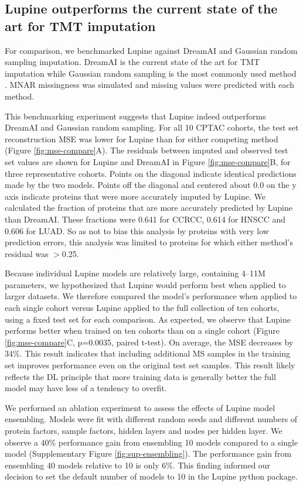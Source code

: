\documentclass{article}
\begin{document}
\subsection{Lupine outperforms the current state of the art for TMT imputation}

For comparison, we benchmarked Lupine against DreamAI and Gaussian random sampling imputation. DreamAI is the current state of the art for TMT imputation \cite{dream-ai} while Gaussian random sampling is the most commonly used method \cite{ms-impute-bench}. MNAR missingness was simulated and missing values were predicted with each method. 

This benchmarking experiment suggests that Lupine indeed outperforms DreamAI and Gaussian random sampling. For all 10 CPTAC cohorts, the test set reconstruction MSE was lower for Lupine than for either competing method (Figure \ref{fig:mse-compare}A). The residuals between imputed and observed test set values are shown for Lupine and DreamAI in Figure \ref{fig:mse-compare}B, for three representative cohorts. Points on the diagonal indicate identical predictions made by the two models. Points off the diagonal and centered about 0.0 on the y axis indicate proteins that were more accurately imputed by Lupine. We calculated the fraction of proteins that are more accurately predicted by Lupine than DreamAI. These fractions were 0.641 for CCRCC, 0.614 for HNSCC and 0.606 for LUAD. So as not to bias this analysis by proteins with very low prediction errors, this analysis was limited to proteins for which either method’s residual was $>$0.25. 

Because individual Lupine models are relatively large, containing 4--11M parameters, we hypothesized that Lupine would perform best when applied to larger datasets. We therefore compared the model's performance when applied to each single cohort versus Lupine applied to the full collection of ten cohorts, using a fixed test set for each comparison.  As expected, we observe that Lupine performs better when trained on ten cohorts than on a single cohort (Figure \ref{fig:mse-compare}C, p=0.0035, paired t-test). On average, the MSE decreases by 34\%.  This result indicates that including additional MS samples in the training set improves performance even on the original test set samples. This result likely reflects the DL principle that more training data is generally better \cite{goodfellow-2016}\textemdash the full model may have less of a tendency to overfit. 

We performed an ablation experiment to assess the effects of Lupine model ensembling. Models were fit with different random seeds and different numbers of protein factors, sample factors, hidden layers and nodes per hidden layer. We observe a 40\% performance gain from ensembling 10 models compared to a single model (Supplementary Figure \ref{fig:sup-ensembling}). The performance gain from ensembling 40 models relative to 10 is only 6\%. This finding informed our decision to set the default number of models to 10 in the Lupine python package. 
\end{document}
